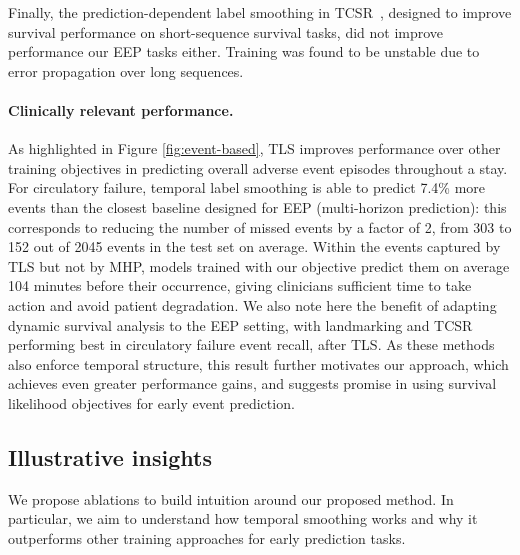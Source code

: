 \documentclass[nohyperref]{article}
\begin{document}
Finally, the prediction-dependent label smoothing in TCSR~\citep{Maystre2022}, designed to improve survival performance on short-sequence survival tasks, did not improve performance our EEP tasks either. Training was found to be unstable due to error propagation over long sequences.





\paragraph{Clinically relevant performance.} As highlighted in Figure \ref{fig:event-based}, TLS improves performance over other training objectives in predicting overall adverse event episodes throughout a stay. For circulatory failure, temporal label smoothing is able to predict 7.4\% more events than the closest baseline designed for EEP (multi-horizon prediction): this corresponds to reducing the number of missed events by a factor of 2, from 303 to 152 out of 2045 events in the test set on average. Within the events captured by TLS but not by MHP, models trained with our objective predict them on average 104 minutes before their occurrence, giving clinicians sufficient time to take action and avoid patient degradation. We also note here the benefit of adapting dynamic survival analysis to the EEP setting, with landmarking and TCSR performing best in circulatory failure event recall, after TLS. As these methods also enforce temporal structure, this result further motivates our approach, which achieves even greater performance gains, and suggests promise in using survival likelihood objectives for early event prediction. 


\subsection{Illustrative insights}
\label{sec:Ablations}

We propose ablations to build intuition around our proposed method. In particular, we aim to understand how temporal smoothing works and why it outperforms other training approaches for early prediction tasks.
\end{document}
